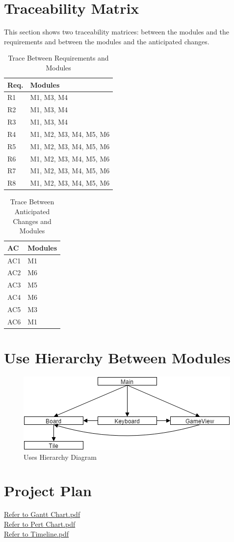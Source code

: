 \documentclass[12pt]{article}
\begin{document}
\section{Traceability Matrix}
This section shows two traceability matrices: between the modules and 
the 
requirements and between the modules and the anticipated changes. 
\smallskip
\begin{table}[!htbp]
	\centering
	\begin{tabular}{p{3cm}|p{9cm}}
		\textbf{Req.} & \textbf{Modules} \\\hline
		R1 & M1, M3, M4\\
		R2 & M1, M3, M4 \\
		R3 & M1, M3, M4 \\
		R4 & M1, M2, M3, M4, M5, M6 \\
		R5 & M1, M2, M3, M4, M5, M6\\
		R6 & M1, M2, M3, M4, M5, M6\\
		R7 & M1, M2, M3, M4, M5, M6\\
		R8 & M1, M2, M3, M4, M5, M6\\\hline
	\end{tabular}
	\caption{Trace Between Requirements and Modules}
	\label{Trace Between Requirements and Modules}
\end{table}
\begin{table}[!htbp]
	\centering
	\begin{tabular}{p{3cm}|p{9cm}}
		\textbf{AC} & \textbf{Modules} \\\hline
		AC1 & M1 \\ 
		AC2 &  M6\\  
		AC3 &  M5\\  
		AC4 &  M6\\ 
		AC5 & M3\\ 
		AC6 & M1\\ \hline
	\end{tabular}
	\caption{Trace Between Anticipated Changes and Modules}
	\label{Trace Between Anticipated Changes and Modules}
\end{table}
\newpage

\section{Use Hierarchy Between Modules}
\begin{figure}[!htbp]
	\includegraphics{uses}
	\centering
	\caption{Uses Hierarchy Diagram}
	\label{Uses Hierarchy Diagram}
\end{figure}

\section {Project Plan}
\href{run:Gantt_Chart.pdf}{Refer to Gantt Chart.pdf}\\
\href{run:Pert_Chart.pdf}{Refer to Pert Chart.pdf}\\
\href{run:Timeline.pdf}{Refer to Timeline.pdf}\\
\end{document}
